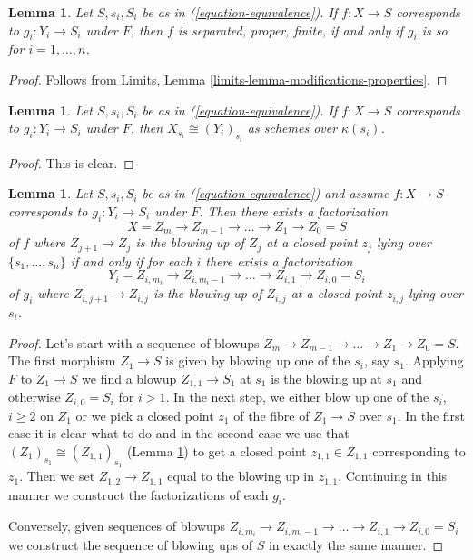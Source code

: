 \documentclass{stacks-project}
\theoremstyle{plain}
\newtheorem{lemma}[subsection]{Lemma}
\theoremstyle{definition}
\theoremstyle{remark}
\numberwithin{equation}{subsection}
\begin{document}
\begin{lemma}
\label{lemma-equivalence-properties}
Let $S, s_i, S_i$ be as in (\ref{equation-equivalence}).
If $f : X \to S$ corresponds to $g_i : Y_i \to S_i$ under $F$,
then $f$ is separated, proper, finite, if and only if $g_i$ is so
for $i = 1, \ldots, n$.
\end{lemma}

\begin{proof}
Follows from Limits, Lemma
\ref{limits-lemma-modifications-properties}.
\end{proof}

\begin{lemma}
\label{lemma-equivalence-fibre}
Let $S, s_i, S_i$ be as in (\ref{equation-equivalence}).
If $f : X \to S$ corresponds to $g_i : Y_i \to S_i$ under $F$,
then $X_{s_i} \cong (Y_i)_{s_i}$ as schemes over $\kappa(s_i)$.
\end{lemma}

\begin{proof}
This is clear.
\end{proof}

\begin{lemma}
\label{lemma-equivalence-sequence-blowups}
Let $S, s_i, S_i$ be as in (\ref{equation-equivalence})
and assume $f : X \to S$ corresponds to $g_i : Y_i \to S_i$ under $F$.
Then there exists a factorization
$$
X = Z_m \to Z_{m - 1} \to \ldots \to Z_1 \to Z_0 = S
$$
of $f$ where $Z_{j + 1} \to Z_j$ is the blowing up of $Z_j$ at a closed
point $z_j$ lying over $\{s_1, \ldots, s_n\}$ if and only if for each
$i$ there exists a factorization
$$
Y_i = Z_{i, m_i} \to Z_{i, m_i - 1} \to \ldots \to Z_{i, 1} \to Z_{i, 0} = S_i
$$
of $g_i$ where $Z_{i, j + 1} \to Z_{i, j}$ is the blowing up of $Z_{i, j}$
at a closed point $z_{i, j}$ lying over $s_i$.
\end{lemma}

\begin{proof}
Let's start with a sequence of blowups
$Z_m \to Z_{m - 1} \to \ldots \to Z_1 \to Z_0 = S$.
The first morphism $Z_1 \to S$ is given
by blowing up one of the $s_i$, say $s_1$. Applying $F$
to $Z_1 \to S$ we find a blowup $Z_{1, 1} \to S_1$ at $s_1$
is the blowing up at $s_1$ and otherwise $Z_{i, 0} = S_i$ for $i > 1$.
In the next step, we either blow up one of the $s_i$, $i \geq 2$
on $Z_1$ or we pick a closed point $z_1$ of the fibre of $Z_1 \to S$
over $s_1$. In the first case it is clear what to do and in
the second case we use that $(Z_1)_{s_1} \cong (Z_{1, 1})_{s_1}$
(Lemma \ref{lemma-equivalence-fibre})
to get a closed point $z_{1, 1} \in Z_{1, 1}$ corresponding to $z_1$.
Then we set $Z_{1, 2} \to Z_{1, 1}$ equal to the blowing up
in $z_{1, 1}$. Continuing in this manner we construct the factorizations
of each $g_i$.

\medskip\noindent
Conversely, given sequences of blowups
$Z_{i, m_i} \to Z_{i, m_i - 1} \to \ldots \to Z_{i, 1} \to Z_{i, 0} = S_i$
we construct the sequence of blowing ups of $S$ in exactly the same manner.
\end{proof}
\end{document}
